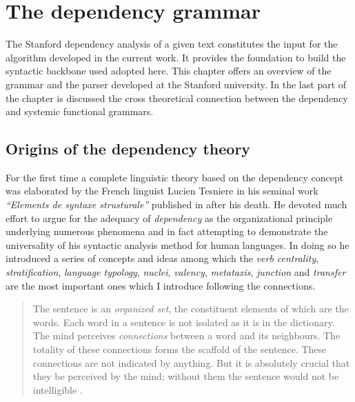 \chapter{The dependency grammar}
\label{ch:dependecy-grammar}

The Stanford dependency analysis of a given text constitutes the input for the algorithm developed in the current work. It provides the foundation to build the syntactic backbone used adopted here. This chapter offers an overview of the grammar and the parser developed at the Stanford university. In the last part of the chapter is discussed the cross theoretical connection between the dependency and systemic functional grammars. 

\section{Origins of the dependency theory}
\label{sec:origins}
For the first time a complete linguistic theory based on the dependency concept was elaborated by the French linguist Lucien Tesniere in his seminal work \textit{``Elements de syntaxe strusturale''} published in \citeyear{Tesniere59} after his death. He devoted much effort to argue for the adequacy of \textit{dependency} as the organizational principle underlying numerous phenomena and in fact attempting to demonstrate the universality of his syntactic analysis method for human languages. In doing so he introduced a series of concepts and ideas among which the \textit{verb centrality}, \textit{stratification}, \textit{language typology}, \textit{nuclei}, \textit{valency}, \textit{metataxis}, \textit{junction} and \textit{transfer} are the most important ones which I introduce following the connections.


\begin{quotation}
    The sentence is an \textit{organized set}, the constituent elements of which are the words. Each word in a sentence is not isolated as it is in the dictionary. The mind perceives \textit{connections} between a word and its neighbours. The totality of these connections forms the scaffold of the sentence. These connections are not indicated by anything. But it is absolutely crucial that they be perceived by the mind; without them the sentence would not be intelligible \citep[3]{Tesniere2015}.
\end{quotation}

